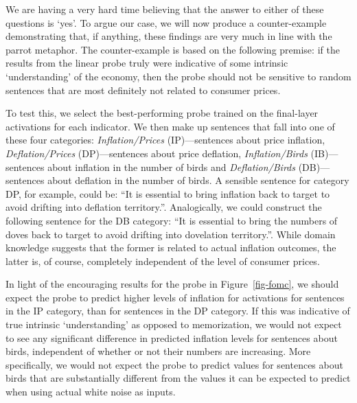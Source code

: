 \documentclass{article}
\theoremstyle{plain}
\theoremstyle{definition}
\theoremstyle{remark}
\begin{document}
We are having a very hard time believing that the answer to either of these questions is `yes'. To argue our case, we will now produce a counter-example demonstrating that, if anything, these findings are very much in line with the parrot metaphor. The counter-example is based on the following premise: if the results from the linear probe truly were indicative of some intrinsic `understanding' of the economy, then the probe should not be sensitive to random sentences that are most definitely not related to consumer prices.

To test this, we select the best-performing probe trained on the final-layer activations for each indicator. We then make up sentences that fall into one of these four categories: \emph{Inflation/Prices} (IP)---sentences about price inflation, \emph{Deflation/Prices} (DP)---sentences about price deflation, \emph{Inflation/Birds} (IB)---sentences about inflation in the number of birds and \emph{Deflation/Birds} (DB)---sentences about deflation in the number of birds. A sensible sentence for category DP, for example, could be: ``It is essential to bring inflation back to target to avoid drifting into deflation territory.''. Analogically, we could construct the following sentence for the DB category: ``It is essential to bring the numbers of doves back to target to avoid drifting into dovelation territory.''. While domain knowledge suggests that the former is related to actual inflation outcomes, the latter is, of course, completely independent of the level of consumer prices.


In light of the encouraging results for the probe in Figure~\ref{fig-fomc}, we should expect the probe to predict higher levels of inflation for activations for sentences in the IP category, than for sentences in the DP category. If this was indicative of true intrinsic `understanding' as opposed to memorization, we would not expect to see any significant difference in predicted inflation levels for sentences about birds, independent of whether or not their numbers are increasing. More specifically, we would not expect the probe to predict values for sentences about birds that are substantially different from the values it can be expected to predict when using actual white noise as inputs.
\end{document}
